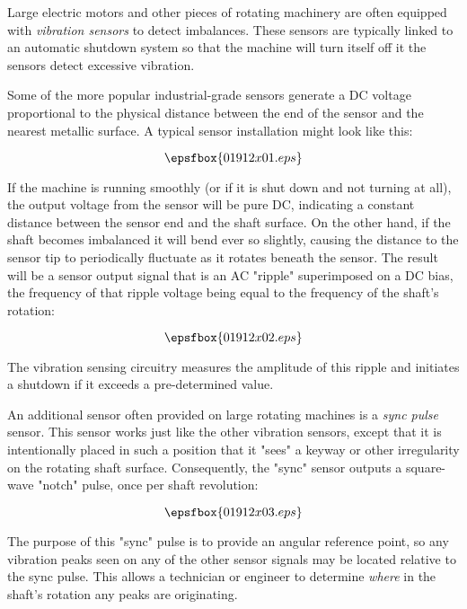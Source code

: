 

Large electric motors and other pieces of rotating machinery are often equipped with {\it vibration sensors} to detect imbalances.  These sensors are typically linked to an automatic shutdown system so that the machine will turn itself off it the sensors detect excessive vibration.

Some of the more popular industrial-grade sensors generate a DC voltage proportional to the physical distance between the end of the sensor and the nearest metallic surface.  A typical sensor installation might look like this:

$$\epsfbox{01912x01.eps}$$

If the machine is running smoothly (or if it is shut down and not turning at all), the output voltage from the sensor will be pure DC, indicating a constant distance between the sensor end and the shaft surface.  On the other hand, if the shaft becomes imbalanced it will bend ever so slightly, causing the distance to the sensor tip to periodically fluctuate as it rotates beneath the sensor.  The result will be a sensor output signal that is an AC "ripple" superimposed on a DC bias, the frequency of that ripple voltage being equal to the frequency of the shaft's rotation:

$$\epsfbox{01912x02.eps}$$

The vibration sensing circuitry measures the amplitude of this ripple and initiates a shutdown if it exceeds a pre-determined value.

An additional sensor often provided on large rotating machines is a {\it sync pulse} sensor.  This sensor works just like the other vibration sensors, except that it is intentionally placed in such a position that it "sees" a keyway or other irregularity on the rotating shaft surface.  Consequently, the "sync" sensor outputs a square-wave "notch" pulse, once per shaft revolution:

$$\epsfbox{01912x03.eps}$$

The purpose of this "sync" pulse is to provide an angular reference point, so any vibration peaks seen on any of the other sensor signals may be located relative to the sync pulse.  This allows a technician or engineer to determine {\it where} in the shaft's rotation any peaks are originating.

